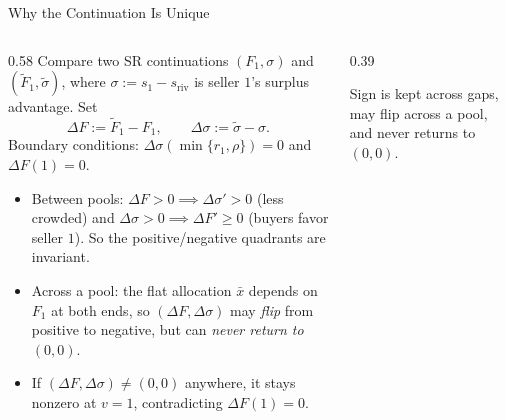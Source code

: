 \documentclass[11pt,aspectratio=169,handout]{beamer}
\def\meditem{\smallskip\item}
\begin{document}
\begin{frame}{Why the Continuation Is Unique}
\begin{columns}[T]
\begin{column}{0.58\textwidth}
Compare two SR continuations $(F_1,\sigma)$ and $(\tilde F_1,\tilde\sigma)$, where $\sigma:=s_1-s_{\mathrm{riv}}$ is seller $1$'s surplus advantage. Set
\[
\Delta F := \tilde F_1 - F_1, \qquad \Delta\sigma := \tilde\sigma - \sigma.
\]
Boundary conditions: $\Delta\sigma(\min\{r_1,\rho\})=0$ and $\Delta F(1)=0$.
\begin{itemize}
\item \alert{Between pools}: $\Delta F>0 \implies \Delta\sigma'>0$ (less crowded) and $\Delta\sigma>0 \implies \Delta F'\ge 0$ (buyers favor seller $1$). So the positive/negative quadrants are invariant.
\meditem \alert{Across a pool}: the flat allocation $\bar x$ depends on $F_1$ at both ends, so $(\Delta F,\Delta\sigma)$ may \emph{flip} from positive to negative, but can \emph{never return to $(0,0)$}.
\meditem If $(\Delta F,\Delta\sigma)\neq(0,0)$ anywhere, it stays nonzero at $v=1$, contradicting $\Delta F(1)=0$.
\end{itemize}
\end{column}
\begin{column}{0.39\textwidth}
\centering{}

\medskip
{\scriptsize Sign is kept across gaps, may flip across a pool, and never returns to $(0,0)$.}
\end{column}
\end{columns}
\end{frame}
\end{document}
